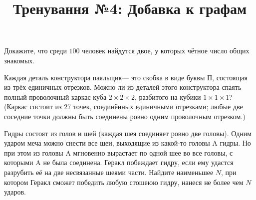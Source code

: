 



\title{Тренування №4: Добавка к графам}
\maketitle

\begin{problem}
	Докажите, что среди $100$ человек найдутся двое, у которых чётное число общих знакомых.
\end{problem}

\begin{problem}
	Каждая деталь конструктора  паяльщик\guillemotright --- это скобка в виде буквы П, состоящая из трёх единичных отрезков. Можно ли из деталей этого конструктора спаять полный проволочный каркас куба $2 \times 2 \times 2$, разбитого на кубики $1 \times 1 \times 1$? (Каркас состоит из 27 точек, соединённых единичными отрезками; любые две соседние точки должны быть соединены ровно одним проволочным отрезком.)
\end{problem}

\begin{problem}
	Гидры состоят из голов и шей (каждая шея соединяет ровно две головы). Одним ударом меча можно снести все шеи, выходящие из какой-то головы A гидры. Но при этом из головы A мгновенно вырастает по одной шее во все головы, с которыми A не была соединена. Геракл побеждает гидру, если ему удастся разрубить её на две несвязанные шеями части. Найдите наименьшее $N$, при котором Геракл сможет победить любую стошеюю гидру, нанеся не более чем $N$ ударов.
\end{problem}

